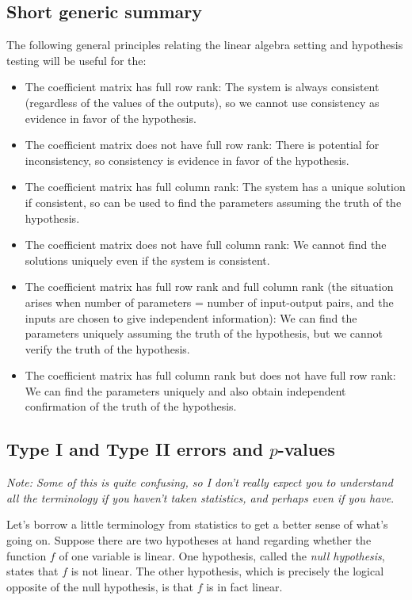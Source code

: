 \documentclass[10pt]{amsart}
\begin{document}
\subsection{Short generic summary}

The following general principles relating the linear algebra setting
and hypothesis testing will be useful for the:

\begin{itemize}
\item The coefficient matrix has full row rank: The system is always
  consistent (regardless of the values of the outputs), so we cannot use
  consistency as evidence in favor of the hypothesis.
\item The coefficient matrix does not have full row rank: There is
  potential for inconsistency, so consistency is evidence in favor of
  the hypothesis.
\item The coefficient matrix has full column rank: The system has a
  unique solution if consistent, so can be used to find the parameters
  assuming the truth of the hypothesis.
\item The coefficient matrix does not have full column rank: We cannot
  find the solutions uniquely even if the system is consistent.
\item The coefficient matrix has full row rank and full column rank
  (the situation arises when number of parameters = number of
  input-output pairs, and the inputs are chosen to give independent
  information): We can find the parameters uniquely assuming the truth
  of the hypothesis, but we cannot verify the truth of the hypothesis.
\item The coefficient matrix has full column rank but does not have
  full row rank: We can find the parameters uniquely and also obtain
  independent confirmation of the truth of the hypothesis.
\end{itemize}

\subsection{Type I and Type II errors and $p$-values}

{\em Note: Some of this is quite confusing, so I don't really expect
  you to understand all the terminology if you haven't taken
  statistics, and perhaps even if you have}.

Let's borrow a little terminology from statistics to get a better
sense of what's going on. Suppose there are two hypotheses at hand
regarding whether the function $f$ of one variable is linear. One
hypothesis, called the {\em null hypothesis}, states that $f$ is not
linear. The other hypothesis, which is precisely the logical opposite
of the null hypothesis, is that $f$ is in fact linear.
 
\end{document}

